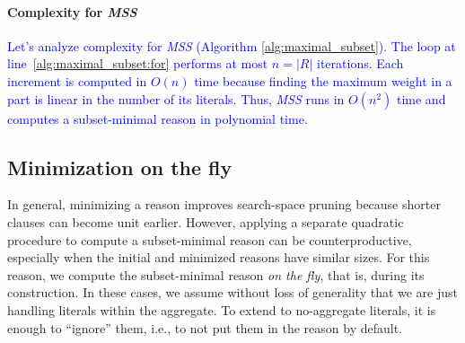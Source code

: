 \documentclass[preprint,authoryear]{elsarticle}
\theoremstyle{definition}
\begin{document}
\paragraph{Complexity for \textit{MSS}}
\textcolor{blue}{Let's analyze complexity for \textit{MSS} (Algorithm \ref{alg:maximal_subset}).
The loop at line~\ref{alg:maximal_subset:for} performs at most $n=|R|$ iterations. Each increment is computed in $O(n)$ time because finding the maximum weight in a part is linear in the number of its literals. Thus, \textit{MSS} runs in $O(n^2)$ time and computes a subset-minimal reason in polynomial time.}


\subsection{Minimization on the fly}
In general, minimizing a reason improves search-space pruning because shorter clauses can become unit earlier. However, applying a separate quadratic procedure to compute a subset-minimal reason can be counterproductive, especially when the initial and minimized reasons have similar sizes.
For this reason, we compute the subset-minimal reason
\textit{on the fly}, that is, during its construction.
In these cases, we assume without loss of generality that we are just handling literals within the aggregate.
To extend to no-aggregate literals, it is enough to ``ignore'' them, i.e., to not put them in the 
reason by default.
\end{document}
